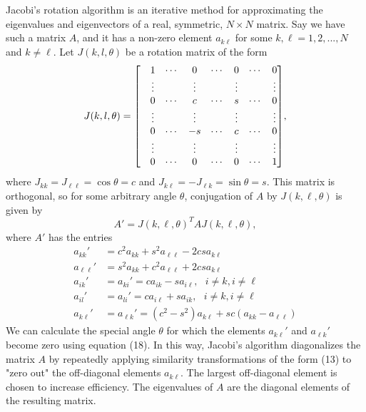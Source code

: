 \documentclass[prb,aps,twocolumn,showpacs,10pt]{revtex4-1}
\newenvironment{psmallmatrix}
  {\left[\begin{matrix}}
  {\end{matrix}\right]}
\begin{document}
Jacobi's rotation algorithm is an iterative method for approximating the eigenvalues and eigenvectors of a real, symmetric, $N\times N$ matrix. Say we have such a matrix  $A$, and it has a non-zero element $a_{k\ell}$ for some $k, \ell = 1,2,...,N$ and $k\neq \ell$. Let $J(k,l,\theta)$ be a rotation matrix of the form
\begin{equation}
J(k,l,\theta) = \begin{psmallmatrix}
&1&\cdots &0 &\cdots &0 &\cdots &0\\
&\vdots& &\vdots & &\vdots & &\vdots\\
&0&\cdots &c &\cdots &s &\cdots &0\\
&\vdots& &\vdots & &\vdots & &\vdots\\
&0&\cdots &-s &\cdots &c &\cdots &0\\
&\vdots& &\vdots & &\vdots & &\vdots\\
&0&\cdots &0 &\cdots &0 &\cdots &1\\
\end{psmallmatrix},
\end{equation}
where $J_{kk}=J_{\ell\ell}=\cos\theta=c$ and $J_{k\ell}=-J_{\ell k}=\sin\theta=s$. This matrix is orthogonal, so for some arbitrary angle $\theta$, conjugation of $A$ by $J(k,\ell,\theta)$ is given by
\begin{equation}
A'=J(k,\ell,\theta)^T A J(k,\ell,\theta),
\end{equation}
where $A'$ has the entries 
\begin{align}
a_{kk}'&=c^2a_{kk}+s^2a_{\ell\ell}-2csa_{k\ell}\\
a_{\ell\ell}'&=s^2a_{kk}+c^2a_{\ell\ell}+2csa_{k\ell}\\
a_{ik}'&=a_{ki}'=ca_{ik}-sa_{i\ell}, \ \ \ i\neq k, i \neq \ell\\
a_{il}'&=a_{li}'=ca_{i\ell}+sa_{ik}, \ \ \ i\neq k, i \neq \ell\\
a_{k\ell}'&=a_{\ell k}'=(c^2-s^2)a_{k\ell}+sc(a_{kk}-a_{\ell\ell})
\end{align}
We can calculate the special angle $\theta$ for which the elements $a_{k\ell}'$ and $a_{\ell k}'$ become zero using equation (18). In this way, Jacobi's algorithm diagonalizes the matrix $A$ by repeatedly applying similarity transformations of the form (13) to "zero out" the off-diagonal elements $a_{k\ell}$. The largest off-diagonal element is chosen to increase efficiency. The eigenvalues of $A$ are the diagonal elements of the resulting matrix.\\
\end{document}
